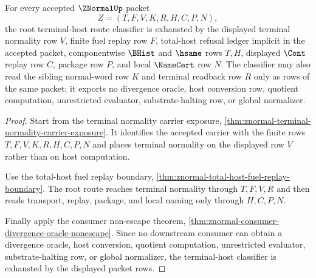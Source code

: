 \begin{theorem}
\label{thm:znormal-root-terminal-host-route-classifier-exhaustion}
For every accepted $\ZNormalUp$ packet
$$
Z=(T,F,V,K,R,H,C,P,N),
$$
the root terminal-host route classifier is exhausted by the displayed
terminal normality row $V$, finite fuel replay row $F$, total-host refusal
ledger implicit in the accepted packet, componentwise $\BHist$ and $\hsame$
rows $T,H$, displayed $\Cont$ replay row $C$, package row $P$, and local
$\NameCert$ row $N$. The classifier may also read the sibling normal-word row
$K$ and terminal readback row $R$ only as rows of the same packet; it exports
no divergence oracle, host conversion row, quotient computation, unrestricted
evaluator, substrate-halting row, or global normalizer.
\end{theorem}
\begin{proof}
Start from the terminal normality carrier exposure,
\autoref{thm:znormal-terminal-normality-carrier-exposure}. It identifies the
accepted carrier with the finite rows $T,F,V,K,R,H,C,P,N$ and places terminal
normality on the displayed row $V$ rather than on host computation.

Use the total-host fuel replay boundary,
\autoref{thm:znormal-total-host-fuel-replay-boundary}. The root route reaches
terminal normality through $T,F,V,R$ and then reads transport, replay,
package, and local naming only through $H,C,P,N$.

Finally apply the consumer non-escape theorem,
\autoref{thm:znormal-consumer-divergence-oracle-nonescape}. Since no
downstream consumer can obtain a divergence oracle, host conversion, quotient
computation, unrestricted evaluator, substrate-halting row, or global
normalizer, the terminal-host classifier is exhausted by the displayed packet
rows.
\end{proof}

